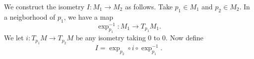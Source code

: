 
We construct the isometry $I:M_1\to M_2$ as follows. 
Take $p_1\in M_1$ and $p_2\in M_2$. In a neigborhood of $p_1$, we have a map 
\[
\exp_{p_1}^{-1}:M_1 \to T_{p_1}M_1. 
\]
We let $i:T_{p_1}M\to T_{p_2}M$ be any isometry taking 0 to 0.  Now define
\[
I=\exp_{p_2}\circ i\circ \exp_{p_1}^{-1}.
\]
